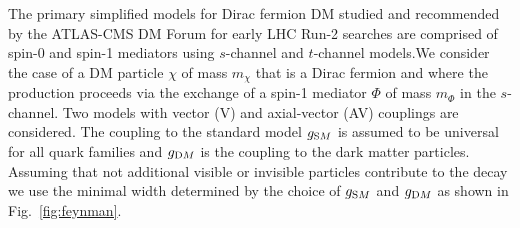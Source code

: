 







The primary simplified models for Dirac fermion DM studied and recommended by the ATLAS-CMS DM Forum for early LHC Run-2 searches are comprised of spin-0 and spin-1 mediators using $s$-channel and $t$-channel models.We consider the case of a DM particle $\chi$ of mass $m_{\chi}$ that is a Dirac fermion and where the production proceeds via the exchange
of a spin-1 mediator $\Phi$ of mass $m_{\Phi}$ in the $s$-channel. Two models with vector (V) and axial-vector (AV) couplings are considered. The coupling to the standard model
$g_{\textrm SM}$ is assumed to be universal for all quark families and $g_{\textrm DM}$ is the coupling to the dark matter particles. Assuming that not additional visible or invisible particles contribute to the decay we use the minimal width determined by the choice of $g_{\textrm SM}$ and $g_{\textrm DM}$ as shown in Fig.~\ref{fig:feynman}.

